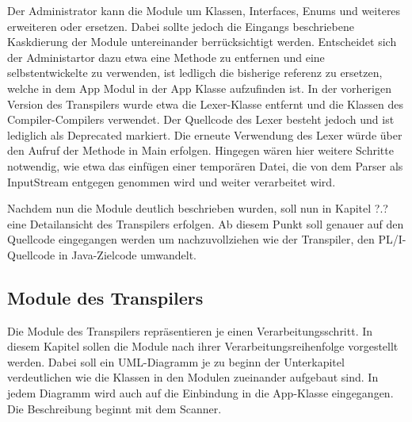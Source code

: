 Der Administrator kann die Module um Klassen, Interfaces, Enums und weiteres erweiteren oder ersetzen.
Dabei sollte jedoch die Eingangs beschriebene Kaskdierung der Module untereinander berrücksichtigt werden.
Entscheidet sich der Administartor dazu etwa eine Methode zu entfernen und eine selbstentwickelte zu verwenden, ist ledligch die bisherige 
referenz zu ersetzen, welche in dem App Modul in der App Klasse aufzufinden ist.
In der vorherigen Version des Transpilers wurde etwa die Lexer-Klasse entfernt und die Klassen des Compiler-Compilers verwendet.
Der Quellcode des Lexer besteht jedoch und ist lediglich als Deprecated markiert. Die erneute Verwendung des Lexer würde über den Aufruf der Methode in Main erfolgen.
Hingegen wären hier weitere Schritte notwendig, wie etwa das einfügen einer temporären Datei, die von dem Parser als InputStream entgegen genommen wird und weiter verarbeitet wird.

Nachdem nun die Module deutlich beschrieben wurden, soll nun in Kapitel ?.? eine Detailansicht des Transpilers erfolgen.
Ab diesem Punkt soll genauer auf den Quellcode eingegangen werden um nachzuvollziehen wie der Transpiler, den PL/I-Quellcode
in Java-Zielcode umwandelt.


 
\subsection{Module des Transpilers}
Die Module des Transpilers repräsentieren je einen Verarbeitungsschritt.
In diesem Kapitel sollen die Module nach ihrer Verarbeitungsreihenfolge vorgestellt werden.
Dabei soll ein UML-Diagramm je zu beginn der Unterkapitel verdeutlichen wie die Klassen
in den Modulen zueinander aufgebaut sind. In jedem Diagramm wird auch auf die Einbindung in die App-Klasse
 eingegangen.
Die Beschreibung beginnt mit dem Scanner.

